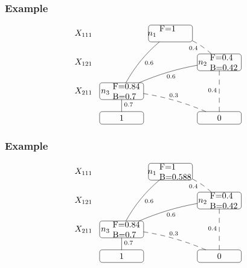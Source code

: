 \documentclass[trans,aspectratio=1610]{beamer}
\begin{document}
\begin{frame}
 \frametitle{Example}
   \begin{scriptsize}
$$\xymatrix@R=5mm@C=2mm
{ X_{111} & &*=<52pt,20pt>[F-:<3pt>]{n_1\ \parbox{40pt}{F=1\\
}}
\ar@/_/@{-}[ldd]^{0.6} \ar@/^/@{--}[dr]_{0.4}\\ 
X_{121}  & & &*=<52pt,20pt>[F-:<3pt>]{n_2\ \parbox{36pt}{F=0.4\\B=0.42}} 
\ar@/_/@{-}[dll]^{0.6}\ar@{--}[dd] _{0.4}
\\
X_{211}& *=<52pt,20pt>[F-:<3pt>]{n_3\ \parbox{35pt}{F=0.84\\B=0.7}}
\ar@{-}[d]^{0.7} \ar@/^/@{--}[drr]^{0.3}  \\
&*=<52pt,15pt>[F-:<3pt>]{1} &&*=<52pt,15pt>[F-:<3pt>]{0}}
$$
\end{scriptsize}
\end{frame}

\begin{frame}
 \frametitle{Example}
   \begin{scriptsize}
$$\xymatrix@R=5mm@C=2mm
{ X_{111} & &*=<52pt,20pt>[F-:<3pt>]{n_1\ \parbox{40pt}{F=1\\
B=0.588}}
\ar@/_/@{-}[ldd]^{0.6} \ar@/^/@{--}[dr]_{0.4}\\ 
X_{121}  & & &*=<52pt,20pt>[F-:<3pt>]{n_2\ \parbox{36pt}{F=0.4\\B=0.42}} 
\ar@/_/@{-}[dll]^{0.6}\ar@{--}[dd] _{0.4}
\\
X_{211}& *=<52pt,20pt>[F-:<3pt>]{n_3\ \parbox{35pt}{F=0.84\\B=0.7}}
\ar@{-}[d]^{0.7} \ar@/^/@{--}[drr]^{0.3}  \\
&*=<52pt,15pt>[F-:<3pt>]{1} &&*=<52pt,15pt>[F-:<3pt>]{0}}
$$
\end{scriptsize}
\end{frame}
\end{document}
